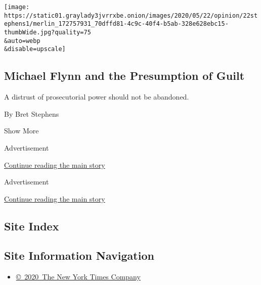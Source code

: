 \begin{enumerate}
  \texttt{[image: https://static01.graylady3jvrrxbe.onion/images/2020/05/22/opinion/22stephens1/merlin\_172757931\_70dffd81-4c9c-40f4-b5ab-328e628ebc15-thumbWide.jpg?quality=75\\\&auto=webp\\\&disable=upscale]}

  \hypertarget{michael-flynn-and-the-presumption-of-guilt}{%
  \subsection{Michael Flynn and the Presumption of
  Guilt}\label{michael-flynn-and-the-presumption-of-guilt}}

  A distrust of prosecutorial power should not be abandoned.

  By Bret Stephens
\end{enumerate}

Show More

Advertisement

\protect\hyperlink{after-mid1}{Continue reading the main story}

Advertisement

\protect\hyperlink{after-mktg}{Continue reading the main story}

\hypertarget{site-index}{%
\subsection{Site Index}\label{site-index}}

\hypertarget{site-information-navigation}{%
\subsection{Site Information
Navigation}\label{site-information-navigation}}

\begin{itemize}
\tightlist
\item
  \href{https://help.nytimes3xbfgragh.onion/hc/en-us/articles/115014792127-Copyright-notice}{©~2020~The
  New York Times Company}
\end{itemize}

